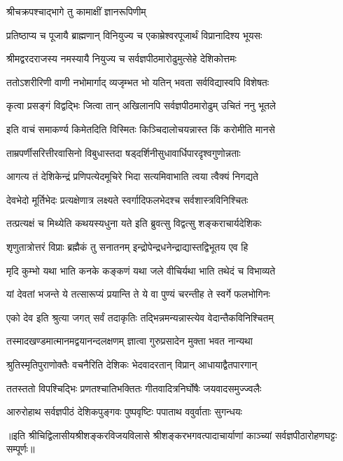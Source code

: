 
\addtocounter{shlokacount}{43}


\onelineshloka
{श्रीचक्रपश्चाद्भागे तु कामाक्षीं ज्ञानरूपिणीम्}%

\twolineshloka
{प्रतिष्ठाप्य च पूजायै ब्राह्मणान् विनियुज्य च}
{एकाम्रेश्वरपूजार्थं विप्रानादिश्य भूयसः}%

\twolineshloka
{श्रीमद्वरदराजस्य नमस्यायै नियुज्य च}
{सर्वज्ञपीठमारोढुमुत्सेहे देशिकोत्तमः}%

\twolineshloka
{ततोऽशरीरिणी वाणी नभोमार्गाद् व्यजृम्भत}
{भो यतिन् भवता सर्वविद्यास्वपि विशेषतः}%

\twolineshloka
{कृत्वा प्रसङ्गं विद्वद्भिः जित्वा तान् अखिलानपि}
{सर्वज्ञपीठमारोढुम् उचितं ननु भूतले}%

\twolineshloka
{इति वाचं समाकर्ण्य किमेतदिति विस्मितः}
{किञ्चिदालोचयन्नास्त किं करोमीति मानसे}%

\twolineshloka
{ताम्रपर्णीसरित्तीरवासिनो विबुधास्तदा}
{षड्दर्शिनीसुधावार्धिपारदृश्वगुणोन्नताः}%

\twolineshloka
{आगत्य तं देशिकेन्द्रं प्रणिपत्येदमूचिरे}
{भिदा सत्यमिवाभाति त्वया त्वैक्यं निगद्यते}%

\twolineshloka
{देवभेदो मूर्तिभेदः प्रत्यक्षेणात्र लक्ष्यते}
{स्वर्गादिफलभेदश्च सर्वशास्त्रविनिश्चितः}%

\twolineshloka
{तत्प्रत्यक्षं च मिथ्येति कथयस्यधुना यते}
{इति ब्रुवत्सु विद्वत्सु शङ्कराचार्यदेशिकः}%

\twolineshloka
{शृणुतात्रोत्तरं विप्राः ब्रह्मैकं तु सनातनम्}
{इन्द्रोपेन्द्रधनेन्द्राद्यास्तद्विभूतय एव हि}%

\twolineshloka
{मृदि कुम्भो यथा भाति कनके कङ्कणं यथा}
{जले वीचिर्यथा भाति तथेदं च विभाव्यते}%

\twolineshloka
{यां देवतां भजन्ते ये तत्सारूप्यं प्रयान्ति ते}
{ये वा पुण्यं चरन्तीह ते स्वर्गे फलभोगिनः}%

\twolineshloka
{एको देव इति श्रुत्या जगत् सर्वं तदाकृतिः}
{तद्भिन्नमन्यन्नास्त्येव वेदान्तैकविनिश्चितम्}%

\twolineshloka
{तस्मादखण्डमात्मानमद्वयानन्दलक्षणम्}
{ज्ञात्वा गुरुप्रसादेन मुक्ता भवत नान्यथा}%

\twolineshloka
{श्रुतिस्मृतिपुराणोक्तैः वचनैरिति देशिकः}
{भेदवादरतान् विप्रान् आधायाद्वैतपारगान्}%

\twolineshloka
{ततस्ततो विपश्चिद्भिः प्रणतश्चातिभक्तितः}
{गीतवादित्रनिर्घोषैः जयवादसमुज्ज्वलैः}%

\twolineshloka
{आरुरोहाथ सर्वज्ञपीठं देशिकपुङ्गवः}
{पुष्पवृष्टिः पपाताथ ववुर्वाताः सुगन्धयः}%

॥इति श्रीचिद्विलासीयश्रीशङ्करविजयविलासे श्री\-शङ्कर\-भगवत्पादा\-चार्या\-णां काञ्च्यां सर्वज्ञ\-पीठा\-रोहण\-घट्टः सम्पूर्णः॥ 
